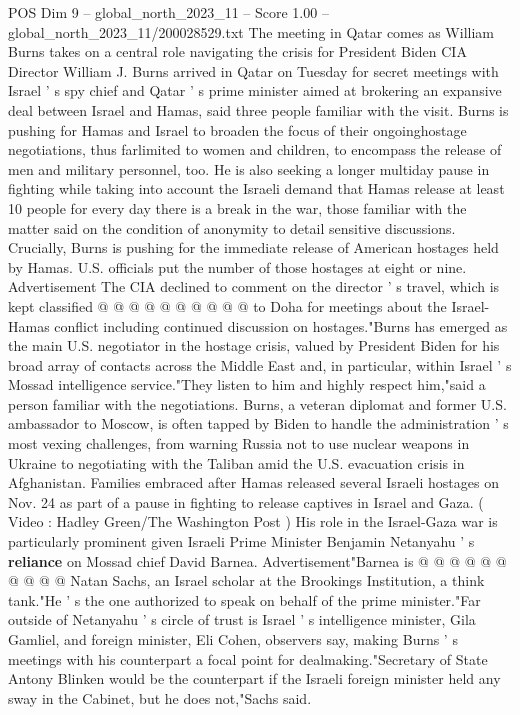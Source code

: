 \begin{textsample}{POS Dim 9 – global\_north\_2023\_11 – Score 1.00 – global\_north\_2023\_11/200028529.txt}  \label{ex:f9_pos_379}
The meeting in Qatar comes as William Burns takes on a central role navigating the crisis for President Biden CIA Director William J.
Burns arrived in Qatar on Tuesday for secret meetings with Israel ' s spy chief and Qatar ' s prime minister aimed at brokering an expansive deal between Israel and Hamas, said three people familiar with the visit.
Burns is pushing for Hamas and Israel to broaden the focus of their ongoinghostage negotiations, thus farlimited to women and children, to encompass the release of men and military personnel, too.
He is also seeking a longer multiday pause in fighting while taking into account the Israeli demand that Hamas release at least 10 people for every day there is a break in the war, those familiar with the matter said on the condition of anonymity to detail sensitive discussions.
Crucially, Burns is pushing for the immediate release of American hostages held by Hamas.
U.S. officials put the number of those hostages at eight or nine.
Advertisement The CIA declined to comment on the director ' s travel, which is kept classified @ @ @ @ @ @ @ @ @ @ to Doha for meetings about the Israel-Hamas conflict including continued discussion on hostages."Burns has emerged as the main U.S. negotiator in the hostage crisis, valued by President Biden for his broad array of contacts across the Middle East and, in particular, within Israel ' s Mossad intelligence service."They listen to him and highly respect him,"said a person familiar with the negotiations.
Burns, a veteran diplomat and former U.S. ambassador to Moscow, is often tapped by Biden to handle the administration ' s most vexing challenges, from warning Russia not to use nuclear weapons in Ukraine to negotiating with the Taliban amid the U.S. evacuation crisis in Afghanistan.
Families embraced after Hamas released several Israeli hostages on Nov. 24 as part of a pause in fighting to release captives in Israel and Gaza. ( Video : Hadley Green/The Washington Post ) His role in the Israel-Gaza war is particularly prominent given Israeli Prime Minister Benjamin Netanyahu ' s \textbf{reliance} on Mossad chief David Barnea.
Advertisement"Barnea is @ @ @ @ @ @ @ @ @ @ Natan Sachs, an Israel scholar at the Brookings Institution, a think tank."He ' s the one authorized to speak on behalf of the prime minister."Far outside of Netanyahu ' s circle of trust is Israel ' s intelligence minister, Gila Gamliel, and foreign minister, Eli Cohen, observers say, making Burns ' s meetings with his counterpart a focal point for dealmaking."Secretary of State Antony Blinken would be the counterpart if the Israeli foreign minister held any sway in the Cabinet, but he does not,"Sachs said.

\end{textsample}
